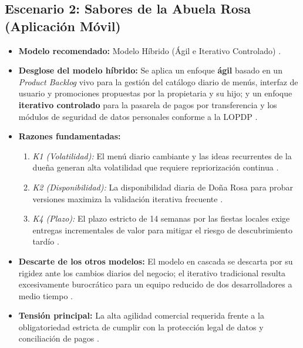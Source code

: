 \documentclass[12pt,a4paper]{article}
\begin{document}
\subsection{Escenario 2: Sabores de la Abuela Rosa (Aplicación Móvil)}
\begin{itemize}
    \item \textbf{Modelo recomendado:} Modelo Híbrido (Ágil e Iterativo Controlado) \cite{Inayat2015}.
    \item \textbf{Desglose del modelo híbrido:} Se aplica un enfoque \textbf{ágil} basado en un \emph{Product Backlog} vivo para la gestión del catálogo diario de menús, interfaz de usuario y promociones propuestas por la propietaria y su hijo; y un enfoque \textbf{iterativo controlado} para la pasarela de pagos por transferencia y los módulos de seguridad de datos personales conforme a la LOPDP \cite{GA_Prac_01}.
    \item \textbf{Razones fundamentadas:}
        \begin{enumerate}
            \item \textit{K1 (Volatilidad):} El menú diario cambiante y las ideas recurrentes de la dueña generan alta volatilidad que requiere repriorización continua \cite{GA_Prac_01, Pohl2025}.
            \item \textit{K2 (Disponibilidad):} La disponibilidad diaria de Doña Rosa para probar versiones maximiza la validación iterativa frecuente \cite{GA_Prac_01}.
            \item \textit{K4 (Plazo):} El plazo estricto de 14 semanas por las fiestas locales exige entregas incrementales de valor para mitigar el riesgo de descubrimiento tardío \cite{Sommerville2016}.
        \end{enumerate}
    \item \textbf{Descarte de los otros modelos:} El modelo en cascada se descarta por su rigidez ante los cambios diarios del negocio; el iterativo tradicional resulta excesivamente burocrático para un equipo reducido de dos desarrolladores a medio tiempo \cite{GA_Prac_01}.
    \item \textbf{Tensión principal:} La alta agilidad comercial requerida frente a la obligatoriedad estricta de cumplir con la protección legal de datos y conciliación de pagos \cite{GA_Prac_01}.
\end{itemize}
\end{document}
